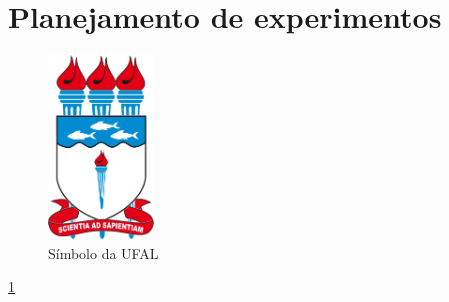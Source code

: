 \chapter{Planejamento de experimentos}
\label{chap:doe}

\begin{figure}[!hbt]
	\centering
	\caption{Símbolo da UFAL}
	\label{fig:1_possuem_celular}
	\includegraphics[width=0.25\textwidth]{imagens/ufal}
\end{figure}

\ref{chap:doe}